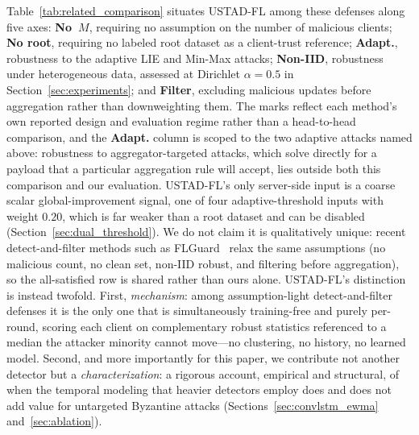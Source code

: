 \documentclass[journal]{IEEEtran}
\begin{document}
Table~\ref{tab:related_comparison} situates USTAD-FL among these defenses along five axes: \textbf{No~$M$}, requiring no assumption on the number of malicious clients; \textbf{No root}, requiring no labeled root dataset as a client-trust reference; \textbf{Adapt.}, robustness to the adaptive LIE and Min-Max attacks; \textbf{Non-IID}, robustness under heterogeneous data, assessed at Dirichlet $\alpha=0.5$ in Section~\ref{sec:experiments}; and \textbf{Filter}, excluding malicious updates before aggregation rather than downweighting them. The marks reflect each method's own reported design and evaluation regime rather than a head-to-head comparison, and the \textbf{Adapt.} column is scoped to the two adaptive attacks named above: robustness to aggregator-targeted attacks, which solve directly for a payload that a particular aggregation rule will accept, lies outside both this comparison and our evaluation. USTAD-FL's only server-side input is a coarse scalar global-improvement signal, one of four adaptive-threshold inputs with weight $0.20$, which is far weaker than a root dataset and can be disabled (Section~\ref{sec:dual_threshold}). We do not claim it is qualitatively unique: recent detect-and-filter methods such as FLGuard~\cite{lee2023flguard} relax the same assumptions (no malicious count, no clean set, non-IID robust, and filtering before aggregation), so the all-satisfied row is shared rather than ours alone. USTAD-FL's distinction is instead twofold. First, \emph{mechanism}: among assumption-light detect-and-filter defenses it is the only one that is simultaneously training-free and purely per-round, scoring each client on complementary robust statistics referenced to a median the attacker minority cannot move---no clustering, no history, no learned model. Second, and more importantly for this paper, we contribute not another detector but a \emph{characterization}: a rigorous account, empirical and structural, of when the temporal modeling that heavier detectors employ does and does not add value for untargeted Byzantine attacks (Sections~\ref{sec:convlstm_ewma} and~\ref{sec:ablation}).
\end{document}
